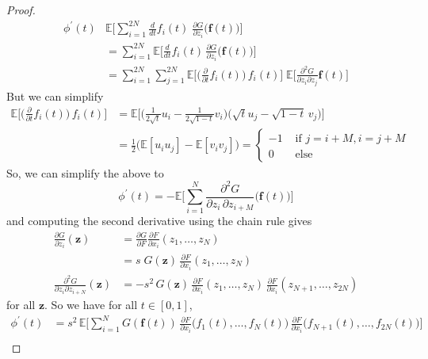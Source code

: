 \documentclass{article}
\theoremstyle{definition}
\theoremstyle{remark}
\theoremstyle{definition}
\begin{document}
\begin{proof}
  \begin{align*}
      \phi^\prime (t) & \mathbb{E}\bigg[ \sum_{i=1}^{2N} \frac{d}{dt} f_i (t) \; \frac{\partial G}{\partial z_i} \big( \mathbf{f}(t)\big) \bigg] \\
      & = \sum_{i=1}^{2N} \mathbb{E} \bigg[ \frac{d}{dt} f_i (t) \, \frac{\partial G}{\partial z_i} \big( \mathbf{f}(t)\big)\bigg] \\
      & = \sum_{i=1}^{2N} \sum_{j=1}^{2N} \mathbb{E} \bigg[ \Big( \frac{\partial}{\partial t} f_i (t) \Big) \, f_i (t) \bigg] \; \mathbb{E} \bigg[ \frac{\partial^2 G}{\partial z_i \partial z_{j}} \mathbf{f} (t) \bigg] 
  \end{align*}
  But we can simplify 
  \begin{align*}
      \mathbb{E} \bigg[ \Big( \frac{\partial}{\partial t} f_i (t) \Big) \, f_i (t) \bigg] & = \mathbb{E} \bigg[ \Big( \frac{1}{2 \sqrt{t}} u_i - \frac{1}{2 \sqrt{1 - t}} v_i \Big) \big( \sqrt{t} u_j - \sqrt{1 - t} \, v_j \big) \bigg] \\
      & = \frac{1}{2} \big(\mathbb{E}[ u_i u_j] - \mathbb{E}[v_i v_j] \big) = \begin{cases} -1 & \text{ if } j = i + M , i = j + M \\
      0 & \text{ else} \end{cases} 
  \end{align*}
  So, we can simplify the above to
  \[\phi^\prime (t) = - \mathbb{E} \bigg[  \sum_{i=1}^N \frac{\partial^2 G}{\partial z_i \, \partial z_{i + M}} \big( \mathbf{f}(t)\big) \bigg]\]
  and computing the second derivative using the chain rule gives 
  \begin{align*}
      \frac{\partial G}{\partial z_i} (\mathbf{z}) & = \frac{\partial G}{\partial F} \frac{\partial F}{\partial x_i} (z_1, \ldots, z_N) \\
      & = s \; G(\mathbf{z}) \, \frac{\partial F}{\partial x_i} (z_1, \ldots, z_N) \\
      \frac{\partial^2 G}{\partial z_i \partial z_{i + N}} (\mathbf{z}) & = - s^2 \, G(\mathbf{z}) \, \frac{\partial F}{\partial x_i} (z_1, \ldots, z_N) \, \frac{\partial F}{\partial x_i} (z_{N+1}, \ldots, z_{2N}) 
  \end{align*}
  for all $\mathbf{z}$. So we have for all $t \in [0, 1]$, 
  \begin{align*}
      \phi^\prime (t) & = s^2 \, \mathbb{E} \bigg[ \sum_{i=1}^N G(\mathbf{f}(t)) \, \frac{\partial F}{\partial x_i} \big( f_1 (t), \ldots, f_N (t) \big) \, \frac{\partial F}{\partial x_i} \big( f_{N+1} (t), \ldots, f_{2N} (t) \big) \bigg] \\ 

\end{align*}
\end{proof}
\end{document}
